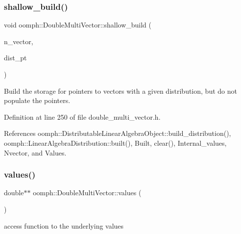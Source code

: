 \subsubsection{\texorpdfstring{shallow\+\_\+build()}{shallow\_build()}\hspace{0.1cm}{\footnotesize\ttfamily [3/3]}}
{\footnotesize\ttfamily void oomph\+::\+Double\+Multi\+Vector\+::shallow\+\_\+build (\begin{DoxyParamCaption}\item[{const unsigned \&}]{n\+\_\+vector,  }\item[{const \hyperlink{classoomph_1_1LinearAlgebraDistribution}{Linear\+Algebra\+Distribution} $\ast$const \&}]{dist\+\_\+pt }\end{DoxyParamCaption})\hspace{0.3cm}{\ttfamily [inline]}}



Build the storage for pointers to vectors with a given distribution, but do not populate the pointers. 



Definition at line 250 of file double\+\_\+multi\+\_\+vector.\+h.



References oomph\+::\+Distributable\+Linear\+Algebra\+Object\+::build\+\_\+distribution(), oomph\+::\+Linear\+Algebra\+Distribution\+::built(), Built, clear(), Internal\+\_\+values, Nvector, and Values.

\mbox{\label{classoomph_1_1DoubleMultiVector_ab6e0f86c71dffe3678598d6c714d113c}} 
\subsubsection{\texorpdfstring{values()}{values()}\hspace{0.1cm}{\footnotesize\ttfamily [1/4]}}
{\footnotesize\ttfamily double$\ast$$\ast$ oomph\+::\+Double\+Multi\+Vector\+::values (\begin{DoxyParamCaption}{ }\end{DoxyParamCaption})\hspace{0.3cm}{\ttfamily [inline]}}



access function to the underlying values 



